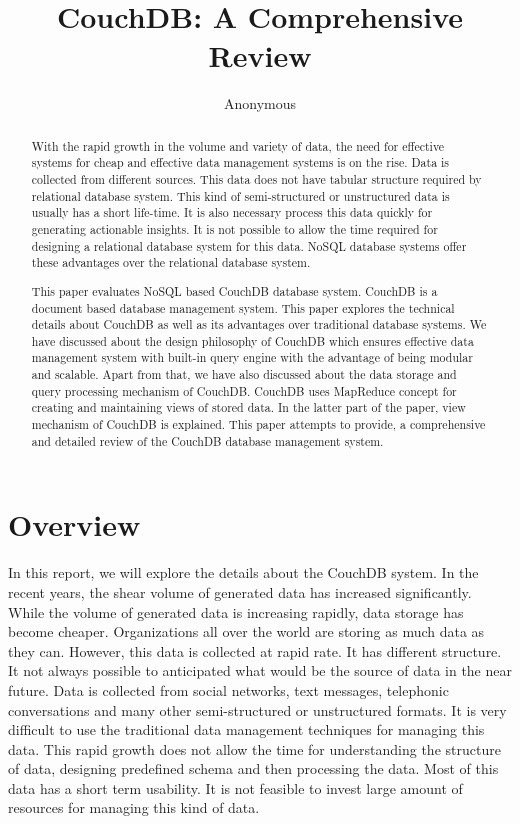 \documentclass{sig-alternate}
\begin{document}
\title{CouchDB: A Comprehensive Review}
\author{
\alignauthor
Anonymous
}
\date{}
\maketitle
\begin{abstract}
  With the rapid growth in the volume and variety of data, the need for effective systems for cheap and effective data management systems is on the rise. Data is collected from different sources. This data does not have tabular structure required by relational database system. This kind of semi-structured or unstructured data is usually has a short life-time. It is also necessary process this data quickly for generating actionable insights. It is not possible to allow the time required for designing a relational database system for this data. NoSQL database systems offer these advantages over the relational database system.

  This paper evaluates NoSQL based CouchDB database system. CouchDB is a document based database management system. This paper explores the technical details about CouchDB as well as its advantages over traditional database systems. We have discussed about the design philosophy of CouchDB which ensures effective data management system with built-in query engine with the advantage of being modular and scalable. Apart from that, we have also discussed about the data storage and query processing mechanism of CouchDB. CouchDB uses MapReduce concept for creating and maintaining views of stored data. In the latter part of the paper, view mechanism of CouchDB is explained. This paper attempts to provide, a comprehensive and detailed review of the CouchDB database management system.
\end{abstract}

\section{Overview}
\label{overview}
In this report, we will explore the details about the CouchDB system. In the recent years, the shear volume of generated data has increased significantly. While the volume of generated data is increasing rapidly, data storage has become cheaper. Organizations all over the world are storing as much data as they can. However, this data is collected at rapid rate. It has different structure. It not always possible to anticipated what would be the source of data in the near future. Data is collected from social networks, text messages, telephonic conversations and many other semi-structured or unstructured formats. It is very difficult to use the traditional data management techniques for managing this data. This rapid growth does not allow the time for understanding the structure of data, designing predefined schema and then processing the data. Most of this data has a short term usability. It is not feasible to invest large amount of resources for managing this kind of data.
\end{document}
